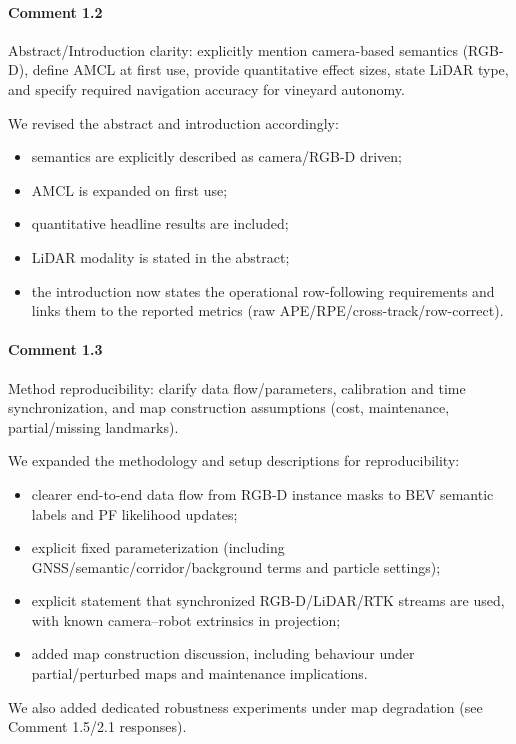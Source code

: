 \documentclass[a4paper]{article}
\def\answer#1#2{\begin{tcolorbox}[width=\textwidth,colback={white},title={\textbf{Answer
 #1}},colbacktitle=answerBoxColor,coltitle=white] #2 \end{tcolorbox} }
\begin{document}
\paragraph{Comment 1.2}
{\color{commentColor}
Abstract/Introduction clarity: explicitly mention camera-based semantics (RGB-D), define AMCL at first use, provide quantitative effect sizes, state LiDAR type, and specify required navigation accuracy for vineyard autonomy.
}
\answer{1.2}{
We revised the abstract and introduction accordingly:
\begin{itemize}
  \item semantics are explicitly described as camera/RGB-D driven;
  \item AMCL is expanded on first use;
  \item quantitative headline results are included;
  \item LiDAR modality is stated in the abstract;
  \item the introduction now states the operational row-following requirements and links them to the reported metrics (raw APE/RPE/cross-track/row-correct).
\end{itemize}
}

\paragraph{Comment 1.3}
{\color{commentColor}
Method reproducibility: clarify data flow/parameters, calibration and time synchronization, and map construction assumptions (cost, maintenance, partial/missing landmarks).
}
\answer{1.3}{
We expanded the methodology and setup descriptions for reproducibility:
\begin{itemize}
  \item clearer end-to-end data flow from RGB-D instance masks to BEV semantic labels and PF likelihood updates;
  \item explicit fixed parameterization (including GNSS/semantic/corridor/background terms and particle settings);
  \item explicit statement that synchronized RGB-D/LiDAR/RTK streams are used, with known camera--robot extrinsics in projection;
  \item added map construction discussion, including behaviour under partial/perturbed maps and maintenance implications.
\end{itemize}
We also added dedicated robustness experiments under map degradation (see Comment 1.5/2.1 responses).
}
\end{document}
